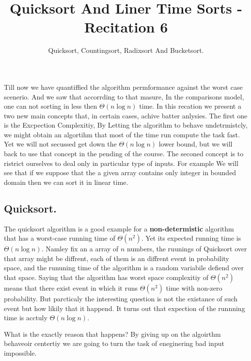 \title{Quicksort And Liner Time Sorts  - Recitation 6} 
\author{Quicksort, Countingsort, Radixsort And Bucketsort.}


Till now we have quantiffied the algorithm permformance against the worst case scenerio. And we saw that accorrding to that masure, In the comparisons model, one can not sorting in less then $\Theta\left( n\log n \right) $ time.  In this recation we present a two new main concepts that, in certain cases, achive batter anlysies. The first one is the Excpection Complexitiy, By Letting the algorithm to behave undetrmistcly, we might obtain an algortihm that most of the time run compute the task fast. Yet we will not secussed get down the $\Theta\left(n\log n\right)$ lower bound, but we will back to use that concept in the pending of the course. The seconed concept is to ristrict ourselves to deal only in particular type of inputs. For example We will see that if we suppose that the a given array contains only integer in bounded domain then we can sort it in linear time.  


\subsection{Quicksort.}
The quicksort algorithm is a good example for a \textbf{non-determistic} algorithm that has a worst-case running time of $\Theta\left(n^{2}\right)$. Yet its expected running time is $\Theta\left(n\log n\right)$. Namley fix an a array of $n$ numbers, the ruunings of Quicksort over that array might be diffrent, each of them is an diffrent event in probability space, and the rununing time of the algorithm is a random variabile defiend over that space. Saying that the algorithm has worst space complexitiy of $\Theta(n^{2})$ means that there exist event in which it runs $\Theta\left(n^{2}\right)$ time with non-zero probability. But parcticaly the interesting question is not the existance of such event but how likily that it happend. It turns out that  expection of the runnning time is acctuly $\Theta\left(n\log n\right)$.  

What is the exactly reason that happens? By giving up on the algoirthm behaveoir centertiy we are going to turn the task of eneginering bad input impossible.    
 
